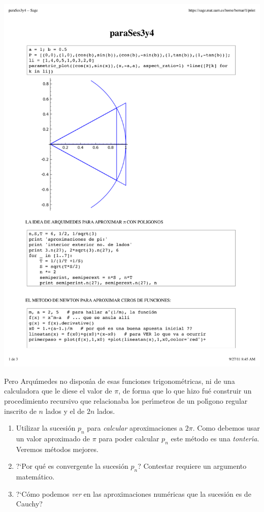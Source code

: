 \bigskip
\begin{center}
 \includegraphics[totalheight=40mm]{imagenes/polincir}
\end{center}
Pero Arqu\'{\i}medes no dispon\'{\i}a de esas funciones trigonom\'etricas, ni de
una calculadora que le diese el valor de 
$\pi$, de forma que lo que hizo fu\'e construir un procedimiento recursivo que
relacionaba los per\'{\i}metros de un pol\'{\i}gono regular inscrito de $n$
lados
y el de $2n$ lados. 

\bigskip \pagebreak[3]
\begin{ejer}
\begin{enumerate}
\item  Utilizar la sucesi\'on $p_n$ para {\itshape calcular} aproximaciones a
$2\pi$.
Como debemos usar un valor aproximado de $\pi$ para poder calcular $p_n$ este
m\'etodo es una
{\itshape tonter\'{\i}a}. Veremos m\'etodos mejores.
\item ?`Por qu\'e es convergente la sucesi\'on $p_n$?  Contestar requiere un
argumento matem\'atico.
\item ?`C\'omo podemos {\itshape ver} en las aproximaciones num\'ericas que la
sucesi\'on es de Cauchy?
\end{enumerate}
\end{ejer}

